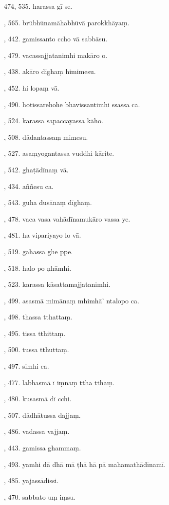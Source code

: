 474, 535. harassa gī se.\par {}, 565. brūbhūnamāhabhūvā parokkhāyaṃ.\par {}, 442. gamissanto ccho vā sabbāsu.\par {}, 479. vacassajjatanimhi makāro o.\par {}, 438. akāro dīghaṃ himimesu.\par {}, 452. hi lopaṃ vā.\par {}, 490. hotissarehohe bhavissantimhi ssassa ca.\par {}, 524. karassa sapaccayassa kāho.\par {}, 508. dādantassaṃ mimesu.\par {}, 527. asaṃyogantassa vuddhi kārite.\par {}, 542. ghaṭādīnaṃ vā.\par {}, 434. aññesu ca.\par {}, 543. guha dusānaṃ dīghaṃ.\par {}, 478. vaca vasa vahādīnamukāro vassa ye.\par {}, 481. ha vipariyayo lo vā.\par {}, 519. gahassa ghe ppe.\par {}, 518. halo po ṇhāmhi.\par {}, 523. karassa kāsattamajjatanimhi.\par {}, 499. asasmā mimānaṃ mhimhā’ ntalopo ca.\par {}, 498. thassa tthattaṃ.\par {}, 495. tissa tthittaṃ.\par {}, 500. tussa tthuttaṃ.\par {}, 497. simhi ca.\par {}, 477. labhasmā ī iṃnaṃ ttha tthaṃ.\par {}, 480. kusasmā dī cchi.\par {}, 507. dādhātussa dajjaṃ.\par {}, 486. vadassa vajjaṃ.\par {}, 443. gamissa ghammaṃ.\par {}, 493. yamhi dā dhā mā ṭhā hā pā mahamathādīnamī.\par {}, 485. yajassādissi.\par {}, 470. sabbato uṃ iṃsu.\par \noindent
